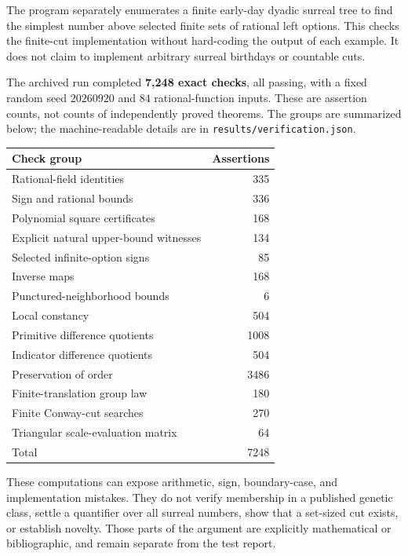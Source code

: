\documentclass[11pt,letterpaper]{article}
\numberwithin{equation}{section}
\theoremstyle{definition}
\theoremstyle{remark}
\begin{document}
The program separately enumerates a finite early-day dyadic surreal tree
to find the simplest number above selected finite sets of rational left
options. This checks the finite-cut implementation without hard-coding
the output of each example. It does not claim to implement arbitrary
surreal birthdays or countable cuts.

The archived run completed \textbf{7,248 exact checks}, all passing,
with a fixed random seed $20260920$ and $84$ rational-function inputs.
These are assertion counts, not counts of independently proved theorems.
The groups are summarized below; the machine-readable details are in
\texttt{results/verification.json}.

\begin{center}
\small
\begin{tabular}{lr}
\toprule
Check group & Assertions\\
\midrule
Rational-field identities &335\\
Sign and rational bounds &336\\
Polynomial square certificates &168\\
Explicit natural upper-bound witnesses &134\\
Selected infinite-option signs &85\\
Inverse maps &168\\
Punctured-neighborhood bounds &6\\
Local constancy &504\\
Primitive difference quotients &1008\\
Indicator difference quotients &504\\
Preservation of order &3486\\
Finite-translation group law &180\\
Finite Conway-cut searches &270\\
Triangular scale-evaluation matrix &64\\
\midrule
Total &7248\\
\bottomrule
\end{tabular}
\end{center}

These computations can expose arithmetic, sign, boundary-case, and
implementation mistakes. They do not verify membership in a published
genetic class, settle a quantifier over all surreal numbers, show that a
set-sized cut exists, or establish novelty. Those parts of the argument
are explicitly mathematical or bibliographic, and remain separate from
the test report.
\end{document}
